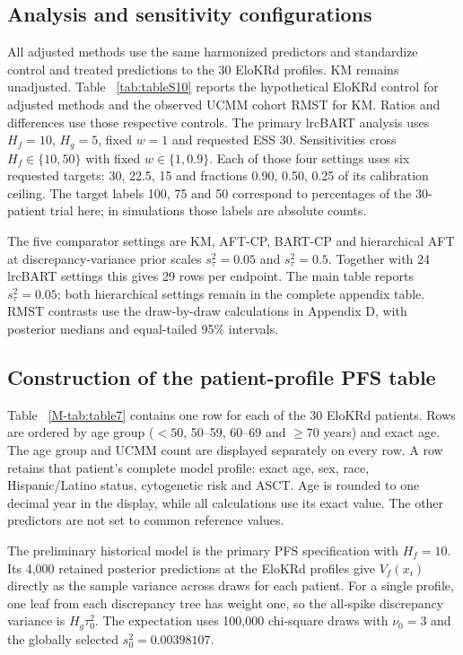 \documentclass[11pt]{article}
\theoremstyle{remark}\newtheorem{remark}{Remark}[section]
\providecommand{\DIFaddtex}[1]{{\protect\color{blue} \sf #1}} %
\providecommand{\DIFaddbegin}{} %
\providecommand{\DIFaddend}{} %
\providecommand{\DIFadd}[1]{\texorpdfstring{\DIFaddtex{#1}}{#1}} %
\begin{document}
\subsection{Analysis and sensitivity configurations}\label{sec:F.2}
All adjusted methods use the same harmonized predictors and standardize control and treated predictions to the 30 EloKRd profiles. KM remains unadjusted. Table \DIFaddbegin \DIFadd{~\ref{tab:tableS10} }\DIFaddend reports the hypothetical EloKRd control for adjusted methods and the observed UCMM cohort RMST for KM. Ratios and differences use those respective controls. The primary lrcBART analysis uses $H_f=10$, $H_g=5$, fixed $w=1$ and requested ESS 30. Sensitivities cross $H_f\in\{10,50\}$ with fixed $w\in\{1,0.9\}$. Each of those four settings uses six requested targets: 30, 22.5, 15 and fractions 0.90, 0.50, 0.25 of its calibration ceiling. The target labels 100, 75 and 50 correspond to percentages of the 30-patient trial here; in simulations those labels are absolute counts.

The five comparator settings are KM, AFT-CP, BART-CP and hierarchical AFT at discrepancy-variance prior scales $s_\tau^2=0.05$ and $s_\tau^2=0.5$. Together with 24 lrcBART settings this gives 29 rows per endpoint. The main table reports $s_\tau^2=0.05$; both hierarchical settings remain in the complete appendix table. RMST contrasts use the draw-by-draw calculations in Appendix D, with posterior medians and equal-tailed 95\% intervals.


\clearpage

\subsection{Construction of the patient-profile PFS table}\label{sec:F.3}
Table \DIFaddbegin \DIFadd{~\ref{M-tab:table7} }\DIFaddend contains one row for each of the 30 EloKRd patients. Rows are ordered by age group ($<50$, 50--59, 60--69 and $\geq70$ years) and exact age. The age group and UCMM count are displayed separately on every row. A row retains that patient's complete model profile: exact age, sex, race, Hispanic/Latino status, cytogenetic risk and ASCT. Age is rounded to one decimal year in the display, while all calculations use its exact value. The other predictors are not set to common reference values.

The preliminary historical model is the primary PFS specification with $H_f=10$. Its 4,000 retained posterior predictions at the EloKRd profiles give $V_f(x_i)$ directly as the sample variance across draws for each patient. For a single profile, one leaf from each discrepancy tree has weight one, so the all-spike discrepancy variance is $H_g\tau_0^2$. The expectation uses 100,000 chi-square draws with $\nu_0=3$ and the globally selected $s_0^2=0.00398107$.
\end{document}
